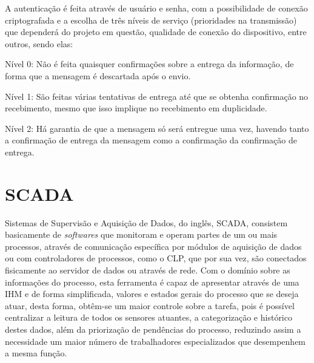         \begin{figure}[!h]
	    \end{figure}
	    
	    A autenticação é feita através de usuário e senha, com a possibilidade de conexão criptografada e a escolha de três níveis de serviço (prioridades na transmissão) que dependerá do projeto em questão, qualidade de conexão do dispositivo, entre outros, sendo elas: 
	    
        \begin{alineascomponto}
        	\item Nível 0: Não é feita quaisquer confirmações sobre a entrega da informação, de forma que a mensagem é descartada após o envio.
        	\item Nível 1: São feitas várias tentativas de entrega até que se obtenha confirmação no recebimento, mesmo que isso implique no recebimento em duplicidade.
        	\item Nível 2: Há garantia de que a mensagem só será entregue uma vez, havendo tanto a confirmação de entrega da mensagem como a confirmação da confirmação de entrega.
        \end{alineascomponto}
        
    \section{SCADA}
    \label{sec:scada}

        Sistemas de Supervisão e Aquisição de Dados, do inglês, \gls{SCADA}, consistem basicamente de \textit{softwares} que monitoram e operam partes de um ou mais processos, através de comunicação específica por módulos de aquisição de dados ou com controladores de processos, como o \gls{CLP}, que por sua vez, são conectados fisicamente ao servidor de dados ou através de rede. Com o domínio sobre as informações do processo, esta ferramenta é capaz de apresentar através de uma \gls{IHM} e de forma simplificada, valores e estados gerais do processo que se deseja atuar, desta forma, obtêm-se um maior controle sobre a tarefa, pois é possível centralizar a leitura de todos os sensores atuantes, a categorização e histórico destes dados, além da priorização de pendências do processo, reduzindo assim a necessidade um maior número de trabalhadores especializados que desempenhem a mesma função. \cite{WhatScada}
        
